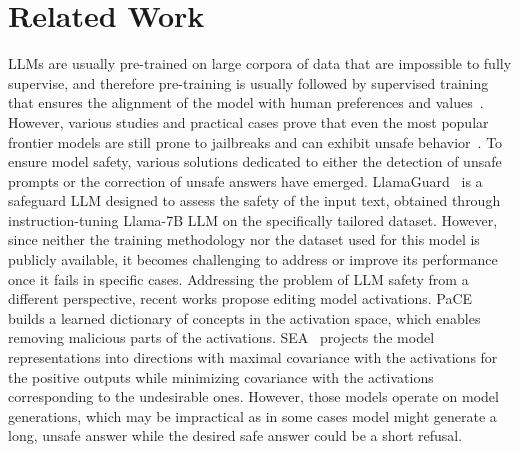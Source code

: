 \section{Related Work}
LLMs are usually pre-trained on large corpora of data that are impossible to fully supervise, and therefore pre-training is usually followed by supervised training that ensures the alignment of the model with human preferences and values~\citep{bai2022training,ouyang2022training,li2024safety}. %
However, various studies and practical cases prove that even the most popular frontier models are still prone to jailbreaks and can exhibit unsafe behavior~\citep{wei2023jailbreak,carlini2023aligned}. To ensure model safety, various solutions dedicated to either the detection of unsafe prompts or the correction of unsafe answers have emerged.
LlamaGuard~\citep{inan2023llama} is a safeguard LLM designed to assess the safety of the input text, obtained through instruction-tuning Llama-7B LLM on the specifically tailored dataset. 
However, since neither the training methodology nor the dataset used for this model is publicly available, it becomes challenging to address or improve its performance once it fails in specific cases.
Addressing the problem of LLM safety from a different perspective, 
recent works propose editing model activations. PaCE~\citep{luo2024pace} builds a learned dictionary of concepts in the activation space, which enables removing malicious parts of the activations. SEA~\citep{qiu2024spectral} projects the model representations into directions with maximal covariance with the activations for the positive outputs while minimizing covariance with the activations corresponding to the undesirable ones. However, those models operate on model generations, which may be impractical as in some cases model might generate a long, unsafe answer while the desired safe answer could be a short refusal.